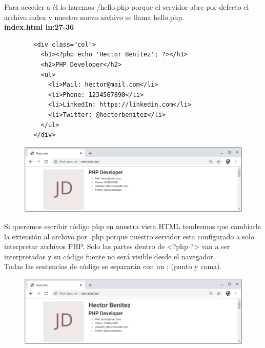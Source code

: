 \documentclass{article}
\begin{document}
Para acceder a él lo haremos /hello.php porque el servidor abre por defecto el
archivo index y nuestro nuevo archivo se llama hello.php.\\

\textbf{index.html  ln:27-36}
\begin{verbatim}
        <div class="col">
          <h1><?php echo 'Hector Benitez'; ?></h1>
          <h2>PHP Developer</h2>
          <ul>
            <li>Mail: hector@mail.com</li>
            <li>Phone: 1234567890</li>
            <li>LinkedIn: https://linkedin.com</li>
            <li>Twitter: @hectorbenitez</li>
          </ul>
        </div>
\end{verbatim}

\newpage

\begin{figure}[h!]
  \centering
  \includegraphics[scale=0.5]{./Pictures/010_indexhtml.png}
\end{figure}

Si queremos escribir código php en nuestra vista HTML tendremos que cambiarle
la extensión al archivo por .php porque nuestro servidor esta configurado a
solo interpretar archivos PHP. Solo las partes dentro de <?php ?> van a ser
interpretadas y su código fuente no será visible desde el navegador.\\

Todas las sentencias de código se separarán con un ; (punto y coma).\\

\begin{figure}[h!]
  \centering
  \includegraphics[scale=0.5]{./Pictures/011_indexphp.png}
\end{figure}
\end{document}
